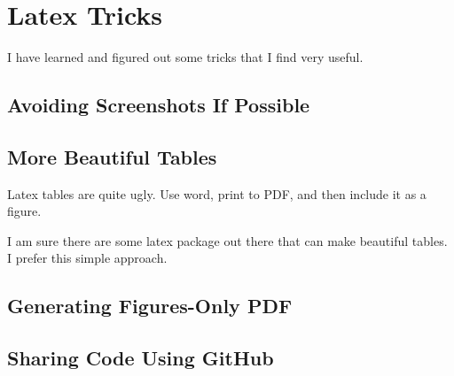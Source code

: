 
\chapter{Latex Tricks}
\label{chapter:tricks}

\thispagestyle{empty}

I have learned and figured out some tricks that I find very useful. 


\minitoc
\newpage




\section{Avoiding Screenshots If Possible}





\section{More Beautiful Tables}

Latex tables are quite ugly. Use word, print to PDF, and then include it as a figure.

I am sure there are some latex package out there that can make beautiful
tables. I prefer this simple approach.




\section{Generating Figures-Only PDF}






\section{Sharing Code Using GitHub}


